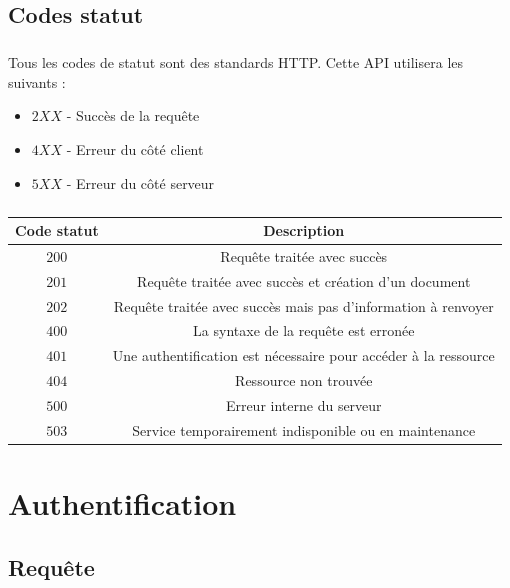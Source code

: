\documentclass[titlepage]{report}
\begin{document}
\section{Codes statut}

\paragraph{} Tous les codes de statut sont des standards HTTP. Cette API utilisera les suivants : 
\begin{itemize}
	\item $ 2XX $ - Succès de la requête
	\item $ 4XX $ - Erreur du côté client
	\item $ 5XX $ - Erreur du côté serveur		
\end{itemize}

\paragraph{}

\begin{center}
	\begin{tabular}{|c|c|}
		\hline
		Code statut & Description \\
		\hline \hline
		$ 200 $ & Requête traitée avec succès \\
		\hline 
		$ 201 $ & Requête traitée avec succès et création d'un document \\	
		\hline 
		$ 202 $ & Requête traitée avec succès mais pas d'information à renvoyer \\
		\hline \hline 
		$ 400 $ & La syntaxe de la requête est erronée \\	
		\hline 
		$ 401 $ & Une authentification est nécessaire pour accéder à la ressource \\	
		\hline
		$ 404 $ & Ressource non trouvée \\
		\hline \hline
		$ 500 $ & Erreur interne du serveur \\
		\hline
		$ 503 $ & Service temporairement indisponible ou en maintenance \\ 	
		\hline
	\end{tabular}
\end{center}

\chapter{Authentification}

\section{Requête}
\end{document}
